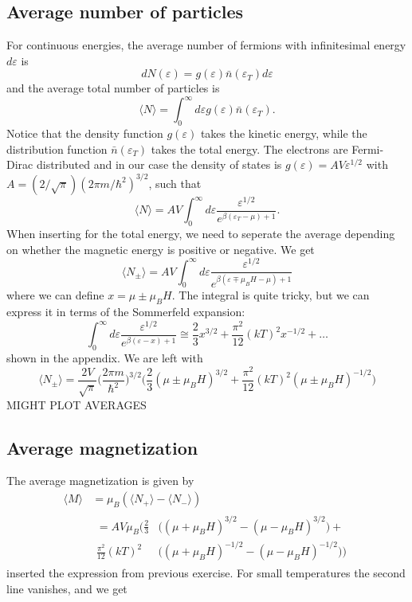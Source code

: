 \documentclass[norsk,a4paper,12pt]{article}
\begin{document}
\subsection{Average number of particles}
For continuous energies, the average number of fermions with infinitesimal energy $d\varepsilon$ is
\begin{equation}
dN(\varepsilon)=g(\varepsilon)\bar{n}(\varepsilon_T)d\varepsilon
\end{equation}
and the average total number of particles is 
\begin{equation}
\langle N\rangle=\int_0^{\infty}d\varepsilon g(\varepsilon)\bar{n}(\varepsilon_T).
\end{equation}
Notice that the density function $g(\varepsilon)$ takes the kinetic energy, while the distribution function $\bar{n}(\varepsilon_T)$ takes the total energy. The electrons are Fermi-Dirac distributed and in our case the density of states is
$g(\varepsilon)=AV\varepsilon^{1/2}$ with $A=(2/\sqrt{\pi})(2\pi m/\hbar^2)^{3/2}$, such that 
\begin{equation}
\langle N\rangle=AV\int_0^{\infty}d\varepsilon\frac{\varepsilon^{1/2}}{e^{\beta(\varepsilon_T-\mu)+1}}.
\end{equation}
When inserting for the total energy, we need to seperate the average depending on whether the magnetic energy is positive or negative. We get
\begin{equation}
\langle N_{\pm}\rangle=AV\int_0^{\infty}d\varepsilon\frac{\varepsilon^{1/2}}{e^{\beta(\varepsilon\mp\mu_BH-\mu)+1}}
\end{equation}
where we can define $x=\mu\pm\mu_BH$. The integral is quite tricky, but we can express it in terms of the Sommerfeld expansion:
\begin{equation}
\int_0^{\infty}d\varepsilon\frac{\varepsilon^{1/2}}{e^{\beta(\varepsilon-x)+1}}\cong\frac{2}{3}x^{3/2}+\frac{\pi^2}{12}(kT)^2x^{-1/2}+\hdots
\end{equation}
shown in the appendix. We are left with
\begin{equation}
\langle N_{\pm}\rangle=\frac{2V}{\sqrt{\pi}}\bigg(\frac{2\pi m}{\hbar^2}\bigg)^{3/2}\bigg(\frac{2}{3}(\mu\pm\mu_BH)^{3/2}+\frac{\pi^2}{12}(kT)^2(\mu\pm\mu_BH)^{-1/2}\bigg)
\end{equation}
MIGHT PLOT AVERAGES

\subsection{Average magnetization}
The average magnetization is given by
\begin{align}
\langle M\rangle&=\mu_B(\langle N_+\rangle-\langle N_-\rangle)\\
&
\begin{aligned}
=AV\mu_B\bigg(\frac{2}{3}&\Big((\mu+\mu_BH)^{3/2}-(\mu-\mu_BH)^{3/2}\Big)+\\
\frac{\pi^2}{12}(kT)^2&\Big((\mu+\mu_BH)^{-1/2}-(\mu-\mu_BH)^{-1/2}\Big)\bigg)
\end{aligned}
\end{align}
inserted the expression from previous exercise. For small temperatures the second line vanishes, and we get
\end{document}
